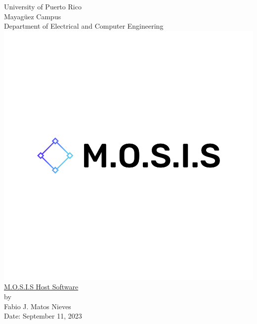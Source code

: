 \linespread{1.0}
\begin{titlepage}
  \begin{center}
    \large{University of Puerto Rico\\
    Mayagüez Campus\\
    \vspace{\baselineskip}
    Department of Electrical and Computer Engineering}
  \includegraphics[scale=0.2]{../Title_Page/default.png}\\
    \Huge{\underline{M.O.S.I.S Host Software}\\}
    \vspace{6cm}
    \large by\\
    Fabio J. Matos Nieves\\
    Date: September 11, 2023\\
    \normalsize

  \end{center}
\end{titlepage}
